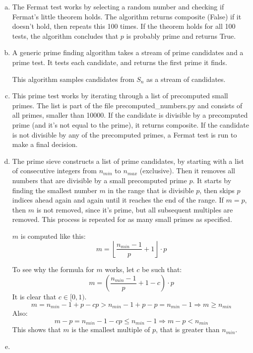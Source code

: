 \documentclass[12pt,a4paper]{article}
\begin{document}
\begin{enumerate}[a)]
    \setlength{\itemsep}{10pt}
    \item
    The Fermat test works by selecting a random number and checking if Fermat's little theorem holds.
    The algorithm returns composite (False) if it doesn't hold, then repeats this 100 times.
    If the theorem holds for all 100 tests, the algorithm concludes that \(p\) is probably prime and returns True.
    \vspace{20pt}
    
    \item
    A generic prime finding algorithm takes a stream of prime candidates and a prime test.
    It tests each candidate, and returns the first prime it finds.
    
    \vspace{20pt}
    This algorithm samples candidates from \(S_n\) as a stream of candidates.
    
    \item
    This prime test works by iterating through a list of precomputed small primes.
    The list is part of the file precomputed\_numbers.py and consists of all primes, smaller than 10000.
    If the candidate is divisible by a precomputed prime (and it's not equal to the prime), it returns composite.
    If the candidate is not divisible by any of the precomputed primes, a Fermat test is run to make a final decision.
    
    \item
    The prime sieve constructs a list of prime candidates, by starting with a list of consecutive integers from
    \(n_{min}\) to \(n_{max}\) (exclusive).
    Then it removes all numbers that are divisible by a small precomputed prime \(p\).
    It starts by finding the smallest number \(m\) in the range that is divisible \(p\), then skips \(p\) indices ahead
    again and again until it reaches the end of the range.
    If \(m = p\), then \(m\) is not removed, since it's prime, but all subsequent multiples are removed.
    This process is repeated for as many small primes as specified.

    \(m\) is computed like this:
    \[m = \left\lfloor \frac{n_{min}-1}{p} + 1 \right\rfloor \cdot p\]
    
    To see why the formula for \(m\) works, let \(c\) be such that:
    \[m = \left( \frac{n_{min}-1}{p} + 1 - c \right) \cdot p\]
    It is clear that \(c \in [0, 1)\).
    \[m = n_{min} - 1 + p - cp > n_{min} - 1 + p - p = n_{min} - 1 \Rightarrow m \geq n_{min}\]
    Also:
    \[m - p = n_{min} - 1 - cp \leq n_{min} - 1 \Rightarrow m - p < n_{min}\]
    This shows that \(m\) is the smallest multiple of \(p\), that is greater than \(n_{min}\).

    \item


\end{enumerate}
\end{document}

